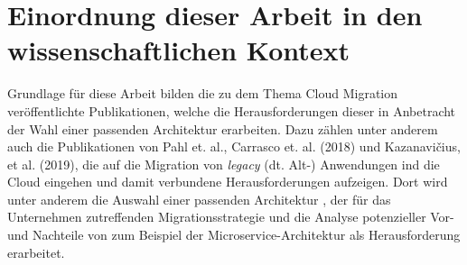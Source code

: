 \section{Einordnung dieser Arbeit in den wissenschaftlichen Kontext}

Grundlage für diese Arbeit bilden die zu dem Thema Cloud Migration veröffentlichte Publikationen, welche die Herausforderungen dieser in Anbetracht der Wahl einer passenden Architektur erarbeiten. Dazu zählen unter anderem auch die Publikationen von Pahl et. al., Carrasco et. al. (2018) und Kazanavičius, et al. (2019), die auf die Migration von \textit{legacy} (dt. Alt-) Anwendungen ind die Cloud eingehen und damit verbundene Herausforderungen aufzeigen. Dort wird unter anderem die Auswahl einer passenden Architektur \cite[Vgl.][S. 14]{Pahl}, der für das Unternehmen zutreffenden Migrationsstrategie \cite[Vgl.][S. 4]{Kazanavicius2019} und die Analyse potenzieller Vor- und Nachteile von zum Beispiel der Microservice-Architektur \cite[Vgl.][S. 3]{Carrasco2018} als Herausforderung erarbeitet.